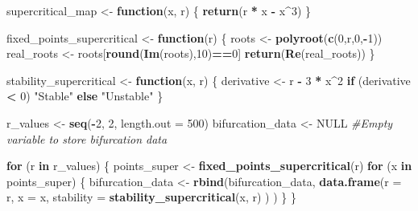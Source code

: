 \documentclass[
]{article}
\newenvironment{Shaded}{\begin{snugshade}}{\end{snugshade}}
\newcommand{\AttributeTok}[1]{\textcolor[rgb]{0.13,0.29,0.53}{#1}}
\newcommand{\CommentTok}[1]{\textcolor[rgb]{0.56,0.35,0.01}{\textit{#1}}}
\newcommand{\ConstantTok}[1]{\textcolor[rgb]{0.56,0.35,0.01}{#1}}
\newcommand{\ControlFlowTok}[1]{\textcolor[rgb]{0.13,0.29,0.53}{\textbf{#1}}}
\newcommand{\DecValTok}[1]{\textcolor[rgb]{0.00,0.00,0.81}{#1}}
\newcommand{\FunctionTok}[1]{\textcolor[rgb]{0.13,0.29,0.53}{\textbf{#1}}}
\newcommand{\NormalTok}[1]{#1}
\newcommand{\OtherTok}[1]{\textcolor[rgb]{0.56,0.35,0.01}{#1}}
\newcommand{\SpecialCharTok}[1]{\textcolor[rgb]{0.81,0.36,0.00}{\textbf{#1}}}
\newcommand{\StringTok}[1]{\textcolor[rgb]{0.31,0.60,0.02}{#1}}
\begin{document}
\begin{Shaded}
\begin{Highlighting}[]
\NormalTok{supercritical\_map }\OtherTok{\textless{}{-}} \ControlFlowTok{function}\NormalTok{(x, r) \{}
  \FunctionTok{return}\NormalTok{(r }\SpecialCharTok{*}\NormalTok{ x }\SpecialCharTok{{-}}\NormalTok{ x}\SpecialCharTok{\^{}}\DecValTok{3}\NormalTok{)}
\NormalTok{\}}

\NormalTok{fixed\_points\_supercritical }\OtherTok{\textless{}{-}} \ControlFlowTok{function}\NormalTok{(r) \{}
\NormalTok{  roots }\OtherTok{\textless{}{-}} \FunctionTok{polyroot}\NormalTok{(}\FunctionTok{c}\NormalTok{(}\DecValTok{0}\NormalTok{,r,}\DecValTok{0}\NormalTok{,}\SpecialCharTok{{-}}\DecValTok{1}\NormalTok{))}
\NormalTok{  real\_roots }\OtherTok{\textless{}{-}}\NormalTok{ roots[}\FunctionTok{round}\NormalTok{(}\FunctionTok{Im}\NormalTok{(roots),}\DecValTok{10}\NormalTok{)}\SpecialCharTok{==}\DecValTok{0}\NormalTok{]}
  \FunctionTok{return}\NormalTok{(}\FunctionTok{Re}\NormalTok{(real\_roots))}
\NormalTok{\}}

\NormalTok{stability\_supercritical }\OtherTok{\textless{}{-}} \ControlFlowTok{function}\NormalTok{(x, r) \{}
\NormalTok{  derivative }\OtherTok{\textless{}{-}}\NormalTok{ r }\SpecialCharTok{{-}} \DecValTok{3} \SpecialCharTok{*}\NormalTok{ x}\SpecialCharTok{\^{}}\DecValTok{2}
  \ControlFlowTok{if}\NormalTok{ (derivative }\SpecialCharTok{\textless{}} \DecValTok{0}\NormalTok{) }\StringTok{"Stable"} \ControlFlowTok{else} \StringTok{"Unstable"}
\NormalTok{\}}

\NormalTok{r\_values }\OtherTok{\textless{}{-}} \FunctionTok{seq}\NormalTok{(}\SpecialCharTok{{-}}\DecValTok{2}\NormalTok{, }\DecValTok{2}\NormalTok{, }\AttributeTok{length.out =} \DecValTok{500}\NormalTok{)}
\NormalTok{bifurcation\_data }\OtherTok{\textless{}{-}} \ConstantTok{NULL} \CommentTok{\#Empty variable to store bifurcation data}

\ControlFlowTok{for}\NormalTok{ (r }\ControlFlowTok{in}\NormalTok{ r\_values) \{}
\NormalTok{  points\_super }\OtherTok{\textless{}{-}} \FunctionTok{fixed\_points\_supercritical}\NormalTok{(r)}
  \ControlFlowTok{for}\NormalTok{ (x }\ControlFlowTok{in}\NormalTok{ points\_super) \{}
\NormalTok{    bifurcation\_data }\OtherTok{\textless{}{-}} \FunctionTok{rbind}\NormalTok{(bifurcation\_data, }
                              \FunctionTok{data.frame}\NormalTok{(}\AttributeTok{r =}\NormalTok{ r, }
                                         \AttributeTok{x =}\NormalTok{ x, }
                                         \AttributeTok{stability =} \FunctionTok{stability\_supercritical}\NormalTok{(x, r)}
\NormalTok{                                         )}
\NormalTok{                              )}
\NormalTok{  \}}
\NormalTok{\}}


\end{Highlighting}
\end{Shaded}
\end{document}
